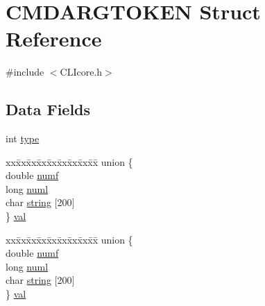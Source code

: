 \hypertarget{structCMDARGTOKEN}{\section{C\+M\+D\+A\+R\+G\+T\+O\+K\+E\+N Struct Reference}
\label{structCMDARGTOKEN}
}


{\ttfamily \#include $<$C\+L\+Icore.\+h$>$}

\subsection*{Data Fields}
\begin{DoxyCompactItemize}
\item 
int \hyperlink{structCMDARGTOKEN_a268f75c3a394c9466df7aba70dc76c00}{type}
\item 
\begin{tabbing}
xx\=xx\=xx\=xx\=xx\=xx\=xx\=xx\=xx\=\kill
union \{\\
\>double \hyperlink{structCMDARGTOKEN_a8f29c19d721dbe26248fc92c01c0e497}{numf}\\
\>long \hyperlink{structCMDARGTOKEN_a8ef8bd8dde032f117c7c316dee08a7c9}{numl}\\
\>char \hyperlink{structCMDARGTOKEN_ac74ef24422dc07823178ebbe43b7ad10}{string} \mbox{[}200\mbox{]}\\
\} \hyperlink{structCMDARGTOKEN_a96839ddcbefc8d1629d9be94a1319bc3}{val}\\

\end{tabbing}\item 
\begin{tabbing}
xx\=xx\=xx\=xx\=xx\=xx\=xx\=xx\=xx\=\kill
union \{\\
\>double \hyperlink{structCMDARGTOKEN_a8f29c19d721dbe26248fc92c01c0e497}{numf}\\
\>long \hyperlink{structCMDARGTOKEN_a8ef8bd8dde032f117c7c316dee08a7c9}{numl}\\
\>char \hyperlink{structCMDARGTOKEN_ac74ef24422dc07823178ebbe43b7ad10}{string} \mbox{[}200\mbox{]}\\
\} \hyperlink{structCMDARGTOKEN_ad930e5d84d27546728b6504a719ab4c6}{val}\\

\end{tabbing}\end{DoxyCompactItemize}


